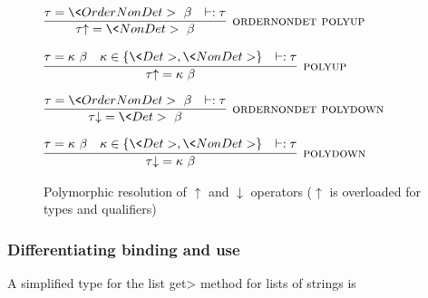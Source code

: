 
\begin{figure}
    $\infer[\rulename{ordernondet polyup}]
    {\up{\tau} = \<NonDet> \ \beta}
    {\tau = \<OrderNonDet> \ \beta
        & \wellformed{\tau}
    }$

    \bigskip
    
    $\infer[\rulename{polyup}]
    {\up{\tau} = \kappa \ \beta}
    {\tau =\kappa \ \beta
        & \kappa \in \{\<Det>, \<NonDet>\}
        & \wellformed{\tau}
    }$

    \bigskip

    $\infer[\rulename{ordernondet polydown}]
    {\down{\tau} = \<Det> \ \beta}
    {\tau = \<OrderNonDet> \ \beta
        & \wellformed{\tau}
    }$
    
    \bigskip
    
    $\infer[\rulename{polydown}]
    {\down{\tau} = \kappa \ \beta}
    {\tau =\kappa \ \beta
        & \kappa \in \{\<Det>, \<NonDet>\}
        & \wellformed{\tau}
    }$
\caption{Polymorphic resolution of $\uparrow$ and $\downarrow$ operators ($\uparrow$ is overloaded for types and qualifiers)}
\label{fig:poly-resolutions}
\end{figure}

\subsubsection{Differentiating binding and use}\label{bindings-uses}

A simplified type for the list \<get> method for lists of strings is

